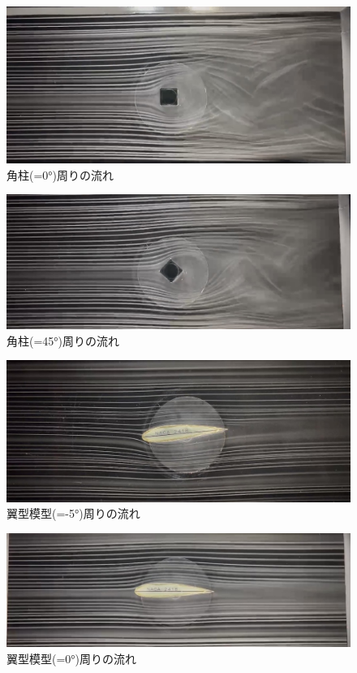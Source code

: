 \documentclass[a4paper,titlepage]{ltjsarticle}
\begin{document}
\begin{figure}[hbtp]
  \centering
  \includegraphics[width=12cm]{角柱０周りの流れ.jpg}
  \caption{角柱(\theta=\ang{0})周りの流れ}
  \label{角柱0}
\end{figure}

\begin{figure}[hbtp]
  \centering
  \includegraphics[width=12cm]{角柱45周りの流れ.jpg}
  \caption{角柱(\theta=\ang{45})周りの流れ}
  \label{角柱45}
\end{figure}

\begin{figure}[hbtp]
  \centering
  \includegraphics[width=12cm]{翼型模型-5周りの流れ.jpg}
  \caption{翼型模型(\theta=\ang{-5})周りの流れ}
  \label{翼型模型-5}
\end{figure}

\begin{figure}[hbtp]
  \centering
  \includegraphics[width=12cm]{翼型模型0周りの流れ.jpg}
  \caption{翼型模型(\theta=\ang{0})周りの流れ}
  \label{翼型模型0}
\end{figure}
\end{document}
